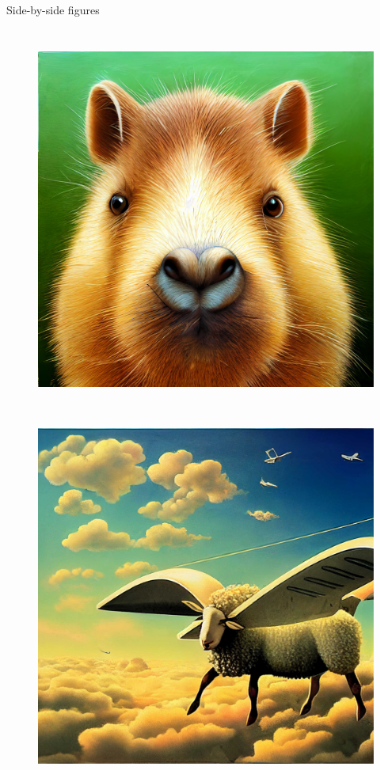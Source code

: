 \documentclass[aspectratio=169]{beamer}
\begin{document}
\begin{frame}[fragile]{Side-by-side figures}
\begin{columns}
	\begin{figure}
		\centering
		\begin{minipage}{.47\textwidth}
			\centering
			\includegraphics[width=.9\linewidth]{curiouscbara}
			\label{fig:test1}
		\end{minipage}~%
		\begin{minipage}{.47\textwidth}
			\centering
			\includegraphics[width=.9\linewidth]{sheep}
			\label{fig:test2}
		\end{minipage}
	\end{figure}

	\end{columns}

	\end{frame}
\end{document}
